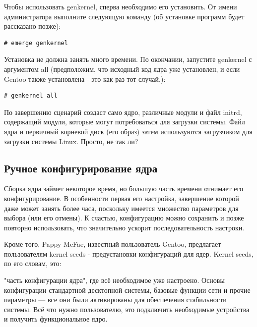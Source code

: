 \documentclass[10pt]{book}
\begin{document}
Чтобы использовать genkernel, сперва необходимо его установить. От имени администратора выполните следующую команду (об установке программ будет рассказано позже):

\vspace{3mm}
\begin{tcolorbox}
\begin{lstlisting}
# emerge genkernel
\end{lstlisting}
\end{tcolorbox}

Установка не должна занять много времени. По окончании, запустите genkernel с аргументом all (предположим, что исходный код ядра уже установлен, и если Gentoo также установлена - это как раз тот случай.):

\vspace{3mm}
\begin{tcolorbox}
\begin{lstlisting}
# genkernel all
\end{lstlisting}
\end{tcolorbox}

По завершению сценарий создаст само ядро, различные модули и файл initrd, содержащий модули, которые могут потребоваться для загрузки системы. Файл ядра и первичный корневой диск (его образ) затем используются загрузчиком для загрузки системы Linux.
Просто, не так ли?

\subsection{Ручное конфигурирование ядра}

Сборка ядра займет некоторое время, но большую часть времени отнимает его конфигурирование. В особенности первая его настройка, завершение которой даже может занять более часа, поскольку имеется множество параметров для выбора (или его отмены). К счастью, конфигурацию можно сохранить и позже повторно использовать, что значительно ускорит последовательность настроки.

Кроме того, Pappy McFae, известный пользователь Gentoo, предлагает  пользователям kernel seeds - предустановки конфигураций для ядер. Kernel seeds, по его словам, это: 

\vspace{3mm}
\begin{tcolorbox}
"часть конфигурации ядра", где всё необходимое уже настроено. Основы конфигурации стандартной десктопной системы, базовые функции сети и прочие параметры — все они были активированы для обеспечения стабильности системы. Всё что нужно пользователю, это подключить необходимые устройства и получить функциональное ядро. 
\end{tcolorbox}
\end{document}

